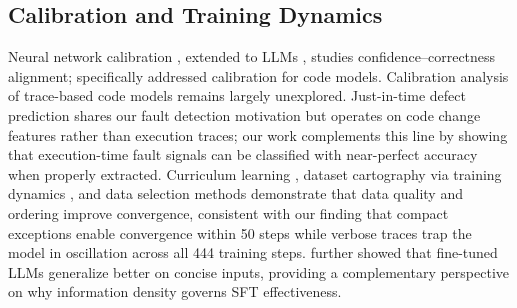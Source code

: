 \begin{table}[t]
\centering
\caption{Cross-model verdict accuracy (\%, $N{=}1{,}190$) across four models and three architecture families. Bold: best per model. $^\ddag$2-seed mean (seed 42 training failure; Appendix~\ref{sec:tokenizer_analysis}). Multi-seed variance in Appendix~\ref{sec:full_results}.}
\label{tab:cross_model}
\small
{}
\end{table}

\subsection{Calibration and Training Dynamics}

Neural network calibration \citep{guo2017calibration}, extended to LLMs \citep{kadavath2022language,geng2024calibration}, studies confidence--correctness alignment; \citet{spiess2025calibration} specifically addressed calibration for code models.
Calibration analysis of trace-based code models remains largely unexplored.
Just-in-time defect prediction \citep{kamei2013large,hoang2019deepjit,pornprasit2021jitline} shares our fault detection motivation but operates on code change features rather than execution traces; our work complements this line by showing that execution-time fault signals can be classified with near-perfect accuracy when properly extracted.
Curriculum learning \citep{bengio2009curriculum}, dataset cartography via training dynamics \citep{swayamdipta2020cartography}, and data selection methods \citep{sachdeva2024dataefficient,xie2023doremi} demonstrate that data quality and ordering improve convergence, consistent with our finding that compact exceptions enable convergence within 50 steps while verbose traces trap the model in oscillation across all 444 training steps.
\citet{yang2024generalization} further showed that fine-tuned LLMs generalize better on concise inputs, providing a complementary perspective on why information density governs SFT effectiveness.

